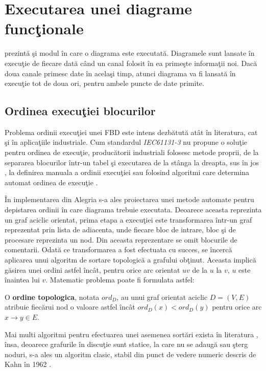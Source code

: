 \section{Executarea unei diagrame funcţionale}
 prezintă şi modul în care o diagrama este executată. Diagramele sunt lansate în execuţie de fiecare dată când un canal folosit în ea primeşte informaţii noi. Dacă doua canale primesc date în acelaşi timp, atunci diagrama va fi lansată în execuţie tot de doua ori, pentru ambele puncte de date primite.

\subsection{Ordinea execuţiei blocurilor}
Problema ordinii execuţiei unei FBD este intens dezbătută atât în literatura, cat şi în aplicaţiile industriale. Cum standardul \textit{IEC61131-3} \autocite{IEC61131-3} nu propune o soluţie pentru ordinea de execuţie, producătorii industriali folosesc metode proprii, de la separarea blocurilor într-un tabel şi executarea de la stânga la dreapta, sus în jos \autocite[11]{TM241}, la definirea manuala a ordinii execuţiei \autocite[11]{Logix5000} sau folosind algoritmi care determina automat ordinea de execuţie \autocite[5]{GEFANUC}.

În implementarea din Alegria s-a ales proiectarea unei metode automate pentru depistarea ordinii în care diagrama trebuie executata. Deoarece aceasta reprezinta un graf aciclic orientat, prima etapa a execuţiei este transformarea într-un graf reprezentat prin lista de adiacenta, unde fiecare bloc de intrare, bloc şi de procesare reprezinta un nod. Din aceasta reprezentare se omit blocurile de comentarii. Odată ce transformarea a fost efectuata cu succes, se încercă aplicarea unui algoritm de sortare topologică\autocite{toposort} a grafului obţinut. Aceasta implică găsirea unei ordini astfel încât, pentru orice arc orientat $uv$ de la  $u$ la $v$, $u$ este înaintea lui $v$. 
Matematic problema poate fi formulata astfel:

\begin{definition} 
	O \textbf{ordine topologica}, notata $ord_D$, au unui graf orientat aciclic $D = (V,E)$ atribuie fiecărui nod o valoare astfel încât $ord_D(x) < ord_D(y)$ pentru orice arc $ x \rightarrow y \in E$.
\end{definition}
Mai multi algoritmi pentru efectuarea unei asemenea sortări exista în literatura \autocite{toposortArticle}, însa, deoarece grafurile în discuţie sunt statice, la care nu se adaugă sau şterg noduri, s-a ales un algoritm clasic, stabil din punct de vedere numeric descris de Kahn în 1962 \autocite{topoKahn}.

